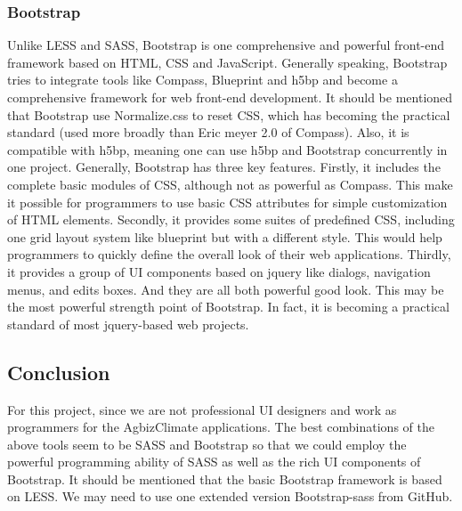 \documentclass[letterpaper,10pt]{article}
\begin{document}
		\subsubsection{Bootstrap}
    Unlike LESS and SASS, Bootstrap is one comprehensive and powerful front-end framework based on HTML, CSS and JavaScript. Generally speaking, Bootstrap tries to integrate tools like Compass, Blueprint and h5bp and become a comprehensive framework for web front-end development. It should be mentioned that Bootstrap use Normalize.css to reset CSS, which has becoming the practical standard (used more broadly than Eric meyer 2.0 of Compass). Also, it is compatible with h5bp, meaning one can use h5bp and Bootstrap concurrently in one project. Generally, Bootstrap has three key features. Firstly, it includes the complete basic modules of CSS, although not as powerful as Compass. This make it possible for programmers to use basic CSS attributes for simple customization of HTML elements. Secondly, it provides some suites of predefined CSS, including one grid layout system like blueprint but with a different style. This would help programmers to quickly define the overall look of their web applications. Thirdly, it provides a group of UI components based on jquery like dialogs, navigation menus, and edits boxes. And they are all both powerful good look. This may be the most powerful strength point of Bootstrap. In fact, it is becoming a practical standard of most jquery-based web projects.

	\subsection{Conclusion}
      For this project, since we are not professional UI designers and work as programmers for the AgbizClimate applications. The best combinations of the above tools seem to be SASS and Bootstrap so that we could employ the powerful programming ability of SASS as well as the rich UI components of Bootstrap. It should be mentioned that the basic Bootstrap framework is based on LESS. We may need to use one extended version Bootstrap-sass from GitHub.
\end{document}
